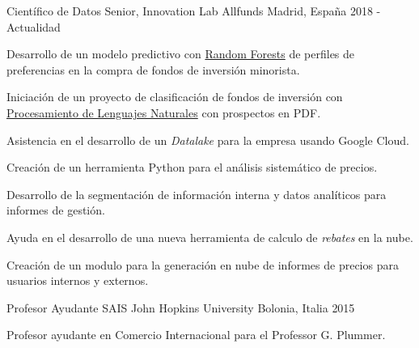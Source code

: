 

\begin{cventries}

\cventry
    {Científico de Datos Senior, Innovation Lab} %
    {Allfunds} %
    {Madrid, España} %
    {2018 - Actualidad} %
    {
        \begin{cvitems} %
            \item {Desarrollo de un modelo predictivo con \href{https://es.wikipedia.org/wiki/Random_forest}{Random Forests} de perfiles de preferencias en la compra de fondos de inversión minorista.}
            \item {Iniciación de un proyecto de clasificación de fondos de inversión con \href{https://es.wikipedia.org/wiki/Procesamiento_de_lenguajes_naturales}{Procesamiento de Lenguajes Naturales} con prospectos en PDF.}
            \item {Asistencia en el desarrollo de un \textit{Datalake} para la empresa usando Google Cloud.}
            \item {Creación de un herramienta Python para el análisis sistemático de precios.}
            \item {Desarrollo de la segmentación de información interna y datos analíticos para informes de gestión.}
            \item {Ayuda en el desarrollo de una nueva herramienta de calculo de \textit{rebates} en la nube.}
            \item {Creación de un modulo para la generación en nube de informes de precios para usuarios internos y externos.}
        \end{cvitems}
    }

\cventry
    {Profesor Ayudante} %
    {SAIS John Hopkins University} %
    {Bolonia, Italia} %
    {2015} %
    {
        \begin{cvitems} %
            \item {Profesor ayudante en Comercio Internacional para el Professor G. Plummer.}
        \end{cvitems}
    }


\end{cventries}
